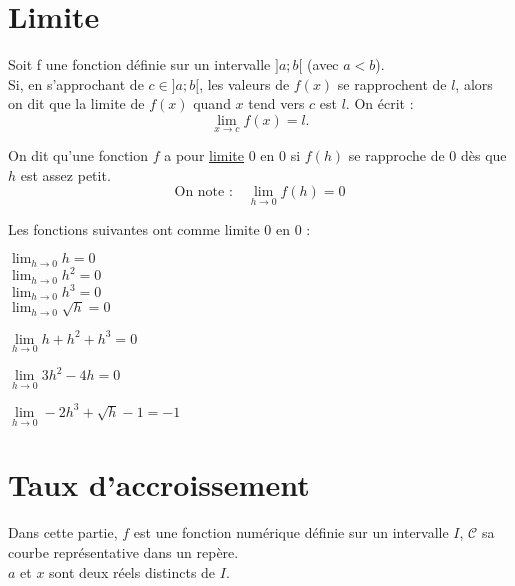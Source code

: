 \documentclass[12pt]{article}
\begin{document}
\setlength{\parindent}{0cm} 

\section{Limite} %

\begin{definition} 
Soit f une fonction définie sur un intervalle $]a;b[$ (avec $a<b$).\\
Si, en s'approchant de $c \in ]a;b[$, les valeurs de \( f(x) \) se rapprochent de \( l \), alors on dit que la limite de \( f(x) \) quand \( x \) tend vers \( c \) est \( l \). On écrit : 
\[
\lim\limits_{x \to c} f(x) = l.
\]

\end{definition}

\begin{definition}[Limite en 0]
   On dit qu'une fonction $f$ a pour \underline{limite} $0$ en $0$ si $f(h)$ se rapproche de $0$ dès que $h$ est assez petit.
$$\text{On note :} \quad \lim_{h\to0}f(h)=0$$
\end{definition}
Les fonctions suivantes ont comme limite $0$ en $0$ :
\begin{multicols}{2}
   $\displaystyle{\lim_{h\to0}h=0}$\\
   $\displaystyle{\lim_{h\to0}h^2=0}$\\
   $\displaystyle{\lim_{h\to0}h^3=0}$\\
   $\displaystyle{\lim_{h\to0}\sqrt{h}=0}$
\end{multicols}

\begin{exemple}
   \begin{enuspaced}
      \item $\lim\limits_{h\to0}h+h^2+h^3=0$
      \item $\lim\limits_{h\to0}3h^2-4h=0$
      \item $\lim\limits_{h\to0}-2h^3+\sqrt{h}-1=-1$
   \end{enuspaced}
\end{exemple}


\section{Taux d'accroissement} 

Dans cette partie, $f$ est une fonction numérique définie sur un intervalle $I$, $\mathcal{C}$ sa courbe représentative dans un repère.\\
$a$ et $x$ sont deux réels distincts de $I$.
\end{document}

